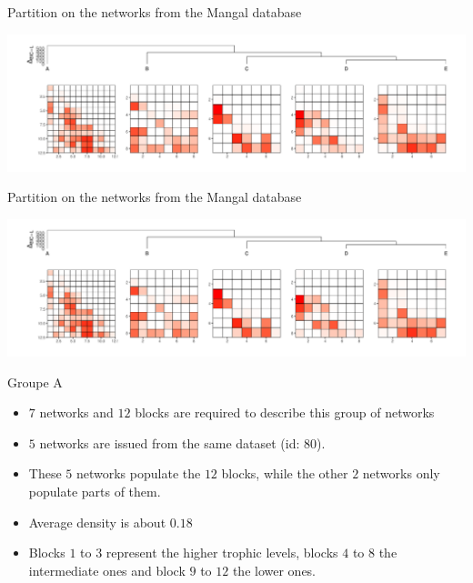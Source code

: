 \documentclass[compress,10pt]{beamer}
\begin{document}
\begin{frame}{Partition on the networks from the Mangal database}



\includegraphics[width=\hsize]{plots/rmangal_pi_newpen_dend_meso}

\end{frame}
\begin{frame}{Partition on the networks from the Mangal database}


\includegraphics[width=\hsize]{plots/rmangal_pi_newpen_dend_meso}

     
 \alert{Groupe A} 
 \begin{itemize}
  \item $7$ networks and $12$ blocks are required to describe this group of networks
  \item $5$ networks are issued from the same dataset (id: 80).
  \item These $5$ networks populate the $12$ blocks, while the other $2$ networks only populate parts of them.
  \item Average density is about $0.18$
  \item Blocks $1$ to $3$ represent the higher trophic levels, blocks $4$ to $8$ the intermediate ones and block $9$ to $12$ the lower ones.    
 \end{itemize}
 


\end{frame}
\end{document}
